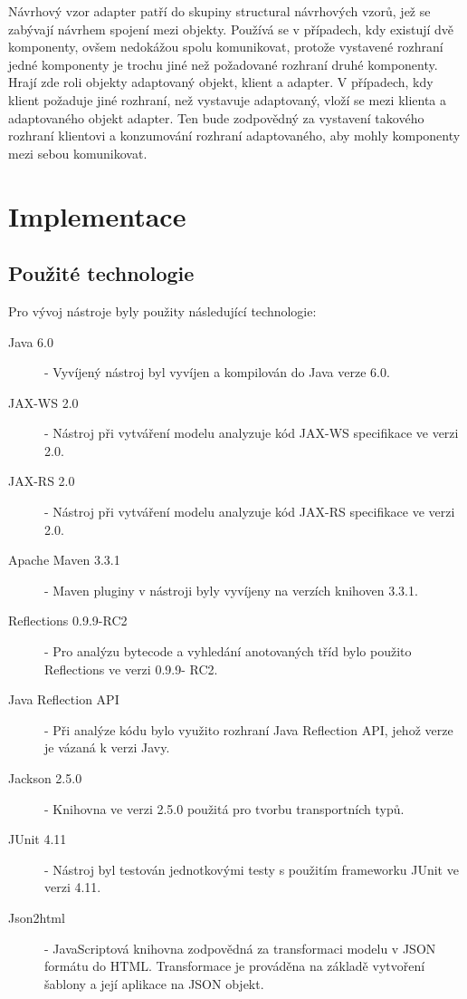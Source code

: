 \documentclass[11pt,twoside,a4paper]{book}
\begin{document}
Návrhový vzor adapter patří do skupiny structural návrhových vzorů, jež se 
zabývají návrhem spojení mezi objekty. Používá se v případech, kdy existují 
dvě komponenty, ovšem nedokážou spolu komunikovat, protože vystavené rozhraní 
jedné komponenty je trochu jiné než požadované rozhraní druhé komponenty. Hrají 
zde roli objekty adaptovaný objekt, klient a adapter. V případech, kdy klient 
požaduje jiné rozhraní, než vystavuje adaptovaný, vloží se mezi klienta a 
adaptovaného objekt adapter. Ten bude zodpovědný za vystavení takového rozhraní 
klientovi a konzumování rozhraní adaptovaného, aby mohly komponenty mezi sebou 
komunikovat.

\chapter{Implementace}

\section{Použité technologie}

Pro vývoj nástroje byly použity následující technologie:
\begin{description}
\item[Java 6.0] - Vyvíjený nástroj byl vyvíjen a kompilován do Java
verze 6.0.
\item[JAX-WS 2.0]- Nástroj při vytváření modelu analyzuje kód JAX-WS
specifikace ve verzi 2.0.
\item[JAX-RS 2.0] - Nástroj při vytváření modelu analyzuje kód JAX-RS
specifikace ve verzi 2.0.
\item[Apache Maven 3.3.1] - Maven pluginy v nástroji byly vyvíjeny na
verzích knihoven 3.3.1.
\item[Reflections 0.9.9-RC2] - Pro analýzu bytecode a vyhledání
anotovaných tříd bylo použito Reflections ve verzi 0.9.9- RC2.
\item[Java Reflection API] - Při analýze kódu bylo využito rozhraní
Java Reflection API, jehož verze je vázaná k verzi Javy.
\item[Jackson 2.5.0] - Knihovna ve verzi 2.5.0 použitá pro tvorbu
transportních typů.
\item[JUnit 4.11] - Nástroj byl testován jednotkovými testy s
použitím frameworku JUnit ve verzi 4.11.
\item[Json2html] - JavaScriptová knihovna zodpovědná za transformaci
modelu v JSON formátu do HTML. Transformace je prováděna na základě vytvoření šablony a její aplikace na JSON objekt.
\end{description}
\end{document}
